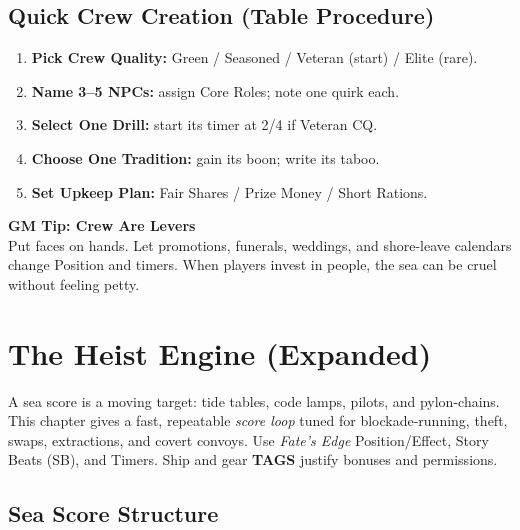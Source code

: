 \documentclass[11pt,oneside]{book}
\begin{document}
\section{Quick Crew Creation (Table Procedure)}

\begin{enumerate}[leftmargin=*,itemsep=2pt]
  \item \textbf{Pick Crew Quality:} Green / Seasoned / Veteran (start) / Elite (rare).
  \item \textbf{Name 3--5 NPCs:} assign Core Roles; note one quirk each.
  \item \textbf{Select One Drill:} start its timer at 2/4 if Veteran CQ.
  \item \textbf{Choose One Tradition:} gain its boon; write its taboo.
  \item \textbf{Set Upkeep Plan:} Fair Shares / Prize Money / Short Rations.
\end{enumerate}

\begin{tcolorbox}[breakable]
\textbf{GM Tip: Crew Are Levers}\\
Put faces on hands. Let promotions, funerals, weddings, and shore-leave calendars change Position and timers. When players invest in people, the sea can be cruel without feeling petty.
\end{tcolorbox}

\chapter{The Heist Engine (Expanded)}

\noindent A sea score is a moving target: tide tables, code lamps, pilots, and pylon-chains. This chapter gives a fast, repeatable \emph{score loop} tuned for blockade-running, theft, swaps, extractions, and covert convoys. Use \textit{Fate's Edge} Position/Effect, Story Beats (SB), and Timers. Ship and gear \textbf{TAGS} justify bonuses and permissions.

\section{Sea Score Structure}
\end{document}
